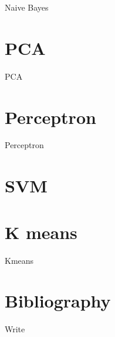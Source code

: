 \documentclass[10pt,a4paper]{article}
\begin{document}
    Naive Bayes
    
    \section{PCA}
    
    PCA
    
    \section{Perceptron}
    
    Perceptron
    
    \section{SVM}
    
    \section{K means}
    
    Kmeans
    
    \section{Bibliography}
    Write
    
\end{document}
